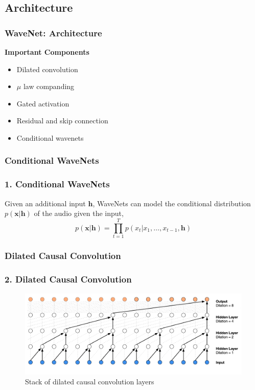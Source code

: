 \documentclass{beamer}
\begin{document}
  \subsection{Architecture}
  \begin{frame}
    \frametitle{WaveNet: Architecture}
    \textbf{Important Components}\\
      \begin{itemize}
        \item Dilated convolution
        \item $\mu$ law companding
        \item Gated activation
        \item Residual and skip connection
        \item Conditional wavenets
      \end{itemize}
  \end{frame}

  \subsubsection{Conditional WaveNets}
  \begin{frame}
    \frametitle{1. Conditional WaveNets}
    Given an additional input $\mathbf{h}$, WaveNets can model the conditional distribution $p(\mathbf{x}|\mathbf{h})$ of the audio given the input,
    \begin{equation*}
      p(\mathbf{x} | \mathbf{h}) = \prod_{t=1}^{T}p(x_t | x_1, \ldots, x_{t-1}, \mathbf{h}) 
    \end{equation*}
  \end{frame}

  \subsubsection{Dilated Causal Convolution}
  \begin{frame}
    \frametitle{2. Dilated Causal Convolution}
    \begin{figure}
      \includegraphics[scale=0.22]{images/wavenet_arch_dilated_conv.png}
      \caption{Stack of dilated causal convolution layers}
    \end{figure}
  \end{frame}
\end{document}
